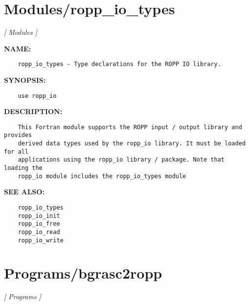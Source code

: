 \section{Modules/ropp\_io\_types}
\textsl{[ Modules ]}

\label{ch:robo78}
\label{ch:Modules_ropp_io_types}
\textbf{NAME:}\hspace{0.08in}\begin{Verbatim}
    ropp_io_types - Type declarations for the ROPP IO library.
\end{Verbatim}
\textbf{SYNOPSIS:}\hspace{0.08in}\begin{Verbatim}
    use ropp_io
\end{Verbatim}
\textbf{DESCRIPTION:}\hspace{0.08in}\begin{Verbatim}
    This Fortran module supports the ROPP input / output library and provides
    derived data types used by the ropp_io library. It must be loaded for all
    applications using the ropp_io library / package. Note that loading the
    ropp_io module includes the ropp_io_types module
\end{Verbatim}
\textbf{SEE ALSO:}\hspace{0.08in}\begin{Verbatim}
    ropp_io_types
    ropp_io_init
    ropp_io_free
    ropp_io_read
    ropp_io_write
\end{Verbatim}
\section{Programs/bgrasc2ropp}
\textsl{[ Programs ]}

